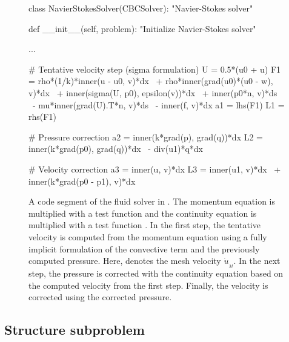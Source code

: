 \begin{figure}
\bwfig
\begin{python}
class NavierStokesSolver(CBCSolver):
    "Navier-Stokes solver"

    def __init__(self, problem):
        "Initialize Navier-Stokes solver"

        ...

        # Tentative velocity step (sigma formulation)
        U = 0.5*(u0 + u)
        F1 = rho*(1/k)*inner(u - u0, v)*dx \
           + rho*inner(grad(u0)*(u0 - w), v)*dx \
           + inner(sigma(U, p0), epsilon(v))*dx \
           + inner(p0*n, v)*ds \
           - mu*inner(grad(U).T*n, v)*ds \
           - inner(f, v)*dx
        a1 = lhs(F1)
        L1 = rhs(F1)

        # Pressure correction
        a2 = inner(k*grad(p), grad(q))*dx
        L2 = inner(k*grad(p0), grad(q))*dx \
           - div(u1)*q*dx

        # Velocity correction
        a3 = inner(u, v)*dx
        L3 = inner(u1, v)*dx \
           + inner(k*grad(p0 - p1), v)*dx
\end{python}
\caption{A code segment of the fluid solver in . The
  momentum equation is multiplied with a test function  and
  the continuity equation is multiplied with a test function
  \emp{q}. In the first step, the tentative velocity is computed
  from the momentum equation using a fully implicit formulation of the
  convective term and the previously computed pressure. Here, 
  denotes the mesh velocity $\dot{u}_{_{M}}$. In the next step, the
  pressure is corrected with the continuity equation based on the
  computed velocity \emp{u1} from the first step. Finally, the
  velocity is corrected using the corrected pressure.}
\label{selim:fig:fluidsolver}
\end{figure}

\subsection{Structure subproblem}

